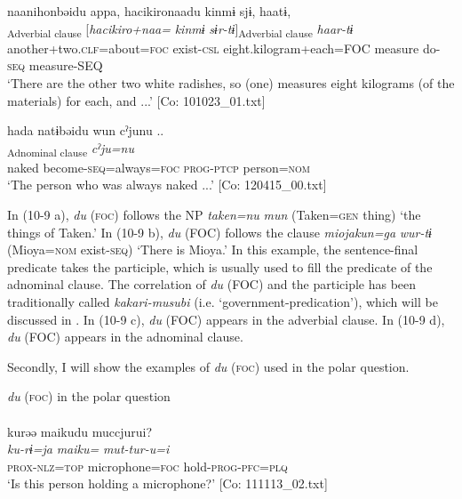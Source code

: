   \ex  %
      \glll    naa{\textbar}nihon{\textbar}bəidu  appa,  {\textbar}hacikiro{\textbar}naadu   kinmɨ  sjɨ,  haatɨ,\\
      [\textit{naa+nihon=bəi=\Highlight{du}}  \textit{ar-ba}]\textsubscript{Adverbial clause}  [\textit{hacikiro+naa=} \textit{kinmɨ}  \textit{sɨr-tɨ}]\textsubscript{Adverbial clause}  \textit{haar-tɨ}\\
      another+two.\textsc{clf}=about=\textsc{foc}  exist-\textsc{csl}  eight.kilogram+each=FOC      measure  do-\textsc{seq}  measure-SEQ\\
      \glt       ‘There are the other two white radishes, so (one) measures eight kilograms (of the materials) for each, and ...’ [Co: 101023\_01.txt]

  \ex  %
      \glll    hada  natɨbəidu  wun  cˀjunu ..\\
      [\textit{hada}  \textit{nar-tɨ=bəi=\Highlight{du}}  \textit{wur-n}]\textsubscript{Adnominal clause}  \textit{cˀju=nu}\\
      naked  become-\textsc{seq}=always=\textsc{foc}  \textsc{prog}-\textsc{ptcp}  person=\textsc{nom}\\
      \glt       ‘The person who was always naked ...’ [Co: 120415\_00.txt]
    \z
\z

In (10-9 a), \textit{du} (\textsc{foc}) follows the NP \textit{taken=nu} \textit{mun} (Taken=\textsc{gen} thing) ‘the things of Taken.’ In (10-9 b), \textit{du} (FOC) follows the clause \textit{miojakun=ga} \textit{wur-tɨ} (Mioya=\textsc{nom} exist-\textsc{seq}) ‘There is Mioya.’ In this example, the sentence-final predicate takes the participle, which is usually used to fill the predicate of the adnominal clause. The correlation of \textit{du} (FOC) and the participle has been traditionally called \textit{kakari-musubi} (i.e. ‘government-predication’), which will be discussed in . In (10-9 c), \textit{du} (FOC) appears in the adverbial clause. In (10-9 d), \textit{du} (FOC) appears in the adnominal clause.

  Secondly, I will show the examples of \textit{du} (\textsc{foc}) used in the polar question.

\ea\label{ex:10.10}   \textit{du} (\textsc{foc}) in the polar question\\
  \ea\relax  [= (8-76 d)]\\
      \glll    kurəə  {\textbar}maiku{\textbar}du  muccjurui?\\
      \textit{ku-rɨ=ja}  \textit{maiku=}  \textit{mut-tur-u=i}\\
      \textsc{prox}-\textsc{nlz}=\textsc{top}  microphone=\textsc{foc}  hold-\textsc{prog}-\textsc{pfc}=\textsc{plq}\\
      \glt       ‘Is this person holding a microphone?’ [Co: 111113\_02.txt]

